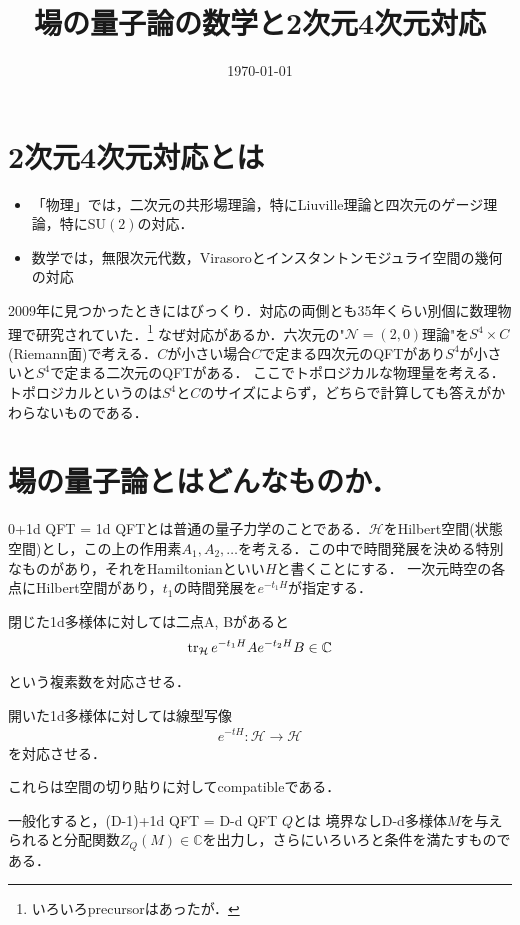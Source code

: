 \documentclass[dvipdfmx, a4paper]{jsarticle}
\title{場の量子論の数学と2次元4次元対応}
\date{\today}
\theoremstyle{break}
\newcommand{\C}{\mathbb{C}}
\newcommand{\SU}{\mathrm{SU}}
\newcommand{\N}{\mathcal{N}}
\renewcommand{\H}{\mathcal{H}}
\begin{document}
	\maketitle
	\tableofcontents
	\section{2次元4次元対応とは}
	\begin{itemize}
			\item 「物理」では，二次元の共形場理論，特にLiuville理論と四次元のゲージ理論，特に$\SU(2)$の対応．
			\item 数学では，無限次元代数，Virasoroとインスタントンモジュライ空間の幾何の対応
	\end{itemize}
	2009年に見つかったときにはびっくり．対応の両側とも35年くらい別個に数理物理で研究されていた．\footnote{いろいろprecursorはあったが．}
	なぜ対応があるか．六次元の"$\N =(2, 0)$理論"を$S^4\times C$(Riemann面)で考える．$C$が小さい場合$C$で定まる四次元のQFTがあり$S^4$が小さいと$S^4$で定まる二次元のQFTがある．
	ここでトポロジカルな物理量を考える．トポロジカルというのは$S^4$と$C$のサイズによらず，どちらで計算しても答えがかわらないものである．

	\section{場の量子論とはどんなものか．}

	0+1d QFT = 1d QFTとは普通の量子力学のことである．$\H$をHilbert空間(状態空間)とし，この上の作用素$A_1, A_2, \ldots$を考える．この中で時間発展を決める特別なものがあり，それをHamiltonianといい$H$と書くことにする．
	一次元時空の各点にHilbert空間があり，$t_1$の時間発展を$e^{-t_1H}$が指定する．

	閉じた1d多様体に対しては二点A, Bがあると
	\begin{align}
			\tr_{\H} e^{-t_1 H }A e^{-t_2 H}B\in\C
	\end{align}

	という複素数を対応させる．

	開いた1d多様体に対しては線型写像
	\begin{align}
			e^{-tH}\colon \H\to \H
	\end{align}
	を対応させる．

	これらは空間の切り貼りに対してcompatibleである．

	一般化すると，(D-1)+1d QFT = D-d QFT $Q$とは
	境界なしD-d多様体$M$を与えられると分配関数$Z_{Q}(M)\in\C$を出力し，さらにいろいろと条件を満たすものである．
\end{document}
